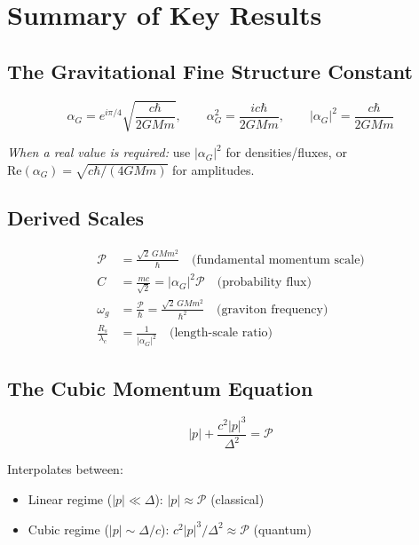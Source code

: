 \documentclass[11pt,a4paper]{article}
\theoremstyle{definition}
\theoremstyle{remark}
\begin{document}
	\section{Summary of Key Results}
	
	\subsection{The Gravitational Fine Structure Constant}
	
	\begin{equation}
		\boxed{\alpha_G = e^{i\pi/4}\sqrt{\frac{c\hbar}{2GMm}}, \qquad \alpha_G^2 = \frac{ic\hbar}{2GMm}, \qquad |\alpha_G|^2 = \frac{c\hbar}{2GMm}}
	\end{equation}
	
	\emph{When a real value is required:} use $|\alpha_G|^2$ for densities/fluxes, or $\mathrm{Re}(\alpha_G)=\sqrt{c\hbar/(4GMm)}$ for amplitudes.
	
	\subsection{Derived Scales}
	
	\begin{align}
		\mathcal{P} &= \frac{\sqrt{2}\,GMm^2}{\hbar} \quad\text{(fundamental momentum scale)} \\
		C &= \frac{mc}{\sqrt{2}} = |\alpha_G|^2\mathcal{P} \quad\text{(probability flux)} \\
		\omega_g &= \frac{\mathcal{P}}{\hbar} = \frac{\sqrt{2}\,GMm^2}{\hbar^2} \quad\text{(graviton frequency)} \\
		\frac{R_s}{\lambda_c} &= \frac{1}{|\alpha_G|^2} \quad\text{(length-scale ratio)}
	\end{align}
	
	\subsection{The Cubic Momentum Equation}
	
	\begin{equation}
		\boxed{|p| + \frac{c^2|p|^3}{\Delta^2} = \mathcal{P}}
	\end{equation}
	
	Interpolates between:
	\begin{itemize}
		\item Linear regime ($|p|\ll\Delta$): $|p|\approx\mathcal{P}$ (classical)
		\item Cubic regime ($|p|\sim\Delta/c$): $c^2|p|^3/\Delta^2\approx\mathcal{P}$ (quantum)
	\end{itemize}
	
\end{document}
